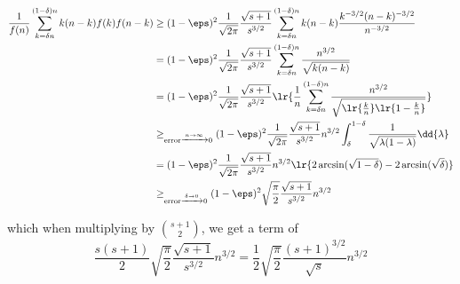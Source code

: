 \documentclass[12pt]{article}
\begin{document}
\begin{align*}
  \frac{1}{f(n)}\sum_{k=\delta n}^{(1-\delta)n} k(n-k)f(k)f(n-k) &\geq (1-\eps)^{2} \frac{1}{\sqrt{2\pi}} \frac{\sqrt{s+1}}{s^{3/2}} \sum_{k=\delta n}^{(1-\delta)n}k(n-k) \frac{k^{-3/2}(n-k)^{-3/2}}{n^{-3/2}}\\
  &= (1-\eps)^{2} \frac{1}{\sqrt{2\pi}} \frac{\sqrt{s+1}}{s^{3/2}} \sum_{k=\delta n}^{(1-\delta)n}\frac{n^{3/2}}{\sqrt{k(n-k)}}\\
  &= (1-\eps)^{2} \frac{1}{\sqrt{2\pi}} \frac{\sqrt{s+1}}{s^{3/2}}\lr{\frac{1}{n} \sum_{k=\delta n}^{(1-\delta)n}\frac{n^{3/2}}{\sqrt{\lr{\frac{k}{n}}\lr{1-\frac{k}{n}}}}}\\
  &\geq_{\text{error}\xrightarrow{n\to\infty}0} (1-\eps)^{2} \frac{1}{\sqrt{2\pi}} \frac{\sqrt{s+1}}{s^{3/2}}n^{3/2}\int_{\delta}^{1-\delta}\frac{1}{\sqrt{\lambda(1-\lambda)}}\dd{\lambda}\\
  &= (1-\eps)^{2} \frac{1}{\sqrt{2\pi}} \frac{\sqrt{s+1}}{s^{3/2}}n^{3/2}\lr{2\arcsin(\sqrt{1-\delta})-2\arcsin(\sqrt{\delta})}\\
  &\geq_{\text{error}\xrightarrow{\delta\to0}0}(1-\eps)^{2} \sqrt{\frac{\pi}{2}} \frac{\sqrt{s+1}}{s^{3/2}}n^{3/2}\\
\end{align*}

which when multiplying by $ \binom{s+1}{2} $, we get a term of
\[
  \frac{s(s+1)}{2}\sqrt{\frac{\pi}{2}}\frac{\sqrt{s+1}}{s^{3/2}}n^{3/2} = \frac{1}{2}\sqrt{\frac{\pi}{2}}\frac{(s+1)^{3/2}}{\sqrt{s}}n^{3/2}
\]
\end{document}
